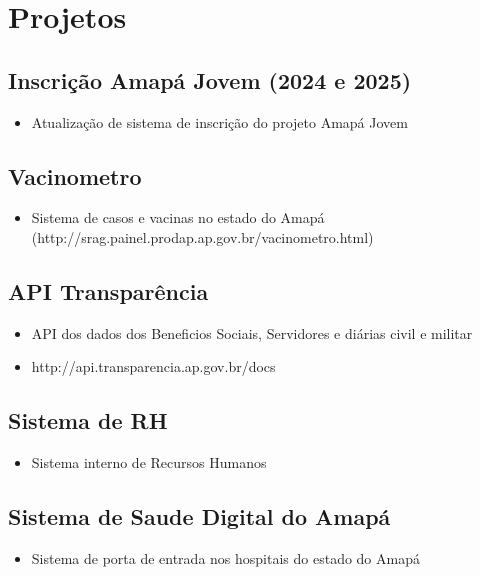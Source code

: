 \documentclass{article}
\begin{document}
\section{\faFlask\enspace Projetos}

\subsection{Inscrição Amapá Jovem (2024 e 2025)}
\begin{itemize}
  \item Atualização de sistema de inscrição do projeto Amapá Jovem
\end{itemize}

\subsection{Vacinometro}
\begin{itemize}
  \item Sistema de casos e vacinas no estado do Amapá (http://srag.painel.prodap.ap.gov.br/vacinometro.html)
\end{itemize}

\subsection{API Transparência}
\begin{itemize}
  \item API dos dados dos Beneficios Sociais, Servidores e diárias civil e militar
  \item http://api.transparencia.ap.gov.br/docs
\end{itemize}

\subsection{Sistema de RH}
\begin{itemize}
  \item Sistema interno de Recursos Humanos
\end{itemize}

\subsection{Sistema de Saude Digital do Amapá}
\begin{itemize}
  \item Sistema de porta de entrada nos hospitais do estado do Amapá
\end{itemize}
\end{document}
